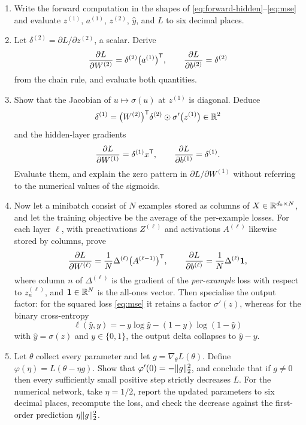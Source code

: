 \begin{enumerate}[label=\textbf{(\alph*)}]
  \item Write the forward computation in the shapes of \eqref{eq:forward-hidden}--\eqref{eq:mse} and evaluate \(z^{(1)}\), \(a^{(1)}\), \(z^{(2)}\), \(\hat y\), and \(L\) to six decimal places.

  \item Let \(\delta^{(2)} = \partial L/\partial z^{(2)}\), a scalar. Derive
  \[
    \frac{\partial L}{\partial W^{(2)}} = \delta^{(2)}\bigl(a^{(1)}\bigr)^{\mathsf{T}},
    \qquad
    \frac{\partial L}{\partial b^{(2)}} = \delta^{(2)}
  \]
  from the chain rule, and evaluate both quantities.

  \item Show that the Jacobian of \(u\mapsto \sigma(u)\) at \(z^{(1)}\) is diagonal. Deduce
  \[
    \delta^{(1)}
    =
    \bigl(W^{(2)}\bigr)^{\mathsf{T}} \delta^{(2)} \odot \sigma'\bigl(z^{(1)}\bigr)
    \in \mathbb{R}^2
  \]
  and the hidden-layer gradients
  \[
    \frac{\partial L}{\partial W^{(1)}} = \delta^{(1)} x^{\mathsf{T}},
    \qquad
    \frac{\partial L}{\partial b^{(1)}} = \delta^{(1)}.
  \]
  Evaluate them, and explain the zero pattern in \(\partial L/\partial W^{(1)}\) without referring to the numerical values of the sigmoids.

  \item Now let a minibatch consist of \(N\) examples stored as columns of \(X\in\mathbb{R}^{d_0\times N}\), and let the training objective be the average of the per-example losses. For each layer \(\ell\), with preactivations \(Z^{(\ell)}\) and activations \(A^{(\ell)}\) likewise stored by columns, prove
  \begin{equation}
    \frac{\partial L}{\partial W^{(\ell)}}
    =
    \frac1N \Delta^{(\ell)}\bigl(A^{(\ell-1)}\bigr)^{\mathsf{T}},
    \qquad
    \frac{\partial L}{\partial b^{(\ell)}}
    =
    \frac1N \Delta^{(\ell)}\mathbf{1},
    \label{eq:batch}
  \end{equation}
  where column \(n\) of \(\Delta^{(\ell)}\) is the gradient of the \emph{per-example} loss with respect to \(z^{(\ell)}_n\), and \(\mathbf{1}\in\mathbb{R}^N\) is the all-ones vector. Then specialise the output factor: for the squared loss \eqref{eq:mse} it retains a factor \(\sigma'(z)\), whereas for the binary cross-entropy
  \[
    \ell(\hat y, y)
    =
    -\, y\log\hat y - (1-y)\log(1-\hat y)
  \]
  with \(\hat y = \sigma(z)\) and \(y\in\{0,1\}\), the output delta collapses to \(\hat y - y\).

  \item Let \(\theta\) collect every parameter and let \(g = \nabla_\theta L(\theta)\). Define \(\varphi(\eta) = L(\theta - \eta g)\). Show that \(\varphi'(0) = -\lVert g\rVert_2^2\), and conclude that if \(g\neq 0\) then every sufficiently small positive step strictly decreases \(L\). For the numerical network, take \(\eta = 1/2\), report the updated parameters to six decimal places, recompute the loss, and check the decrease against the first-order prediction \(\eta\lVert g\rVert_2^2\).
\end{enumerate}


